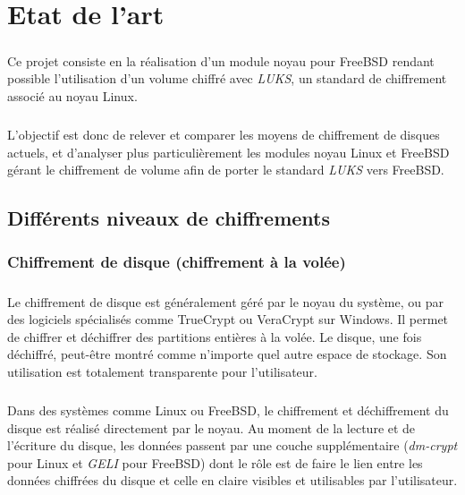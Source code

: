 \chapter{Etat de l'art}

\paragraph{}
Ce projet consiste en la réalisation d'un module noyau pour FreeBSD rendant
possible l'utilisation d'un volume chiffré avec \textit{LUKS}, un standard de
chiffrement associé au noyau Linux.
\paragraph{}
L'objectif est donc de relever et comparer les moyens de chiffrement de disques
actuels, et d'analyser plus particulièrement les modules noyau Linux et FreeBSD
gérant le chiffrement de volume afin de porter le standard \textit{LUKS} vers
FreeBSD.

\section{Différents niveaux de chiffrements}

\subsection{Chiffrement de disque (chiffrement à la volée)}
\paragraph{}
Le chiffrement de disque est généralement géré par le noyau du système, ou par
des logiciels spécialisés comme TrueCrypt ou VeraCrypt sur Windows. Il permet de
chiffrer et déchiffrer des partitions entières à la volée. Le disque, une fois
déchiffré, peut-être montré comme n'importe quel autre espace de stockage. Son
utilisation est totalement transparente pour l'utilisateur.
\paragraph{}
Dans des systèmes comme Linux ou FreeBSD, le chiffrement et déchiffrement du
disque est réalisé directement par le noyau. Au moment de la lecture et de
l'écriture du disque, les données passent par une couche supplémentaire
(\textit{dm-crypt} pour Linux et \textit{GELI} pour FreeBSD) dont le rôle est de
faire le lien entre les données chiffrées du disque et celle en claire visibles
et utilisables par l'utilisateur.
